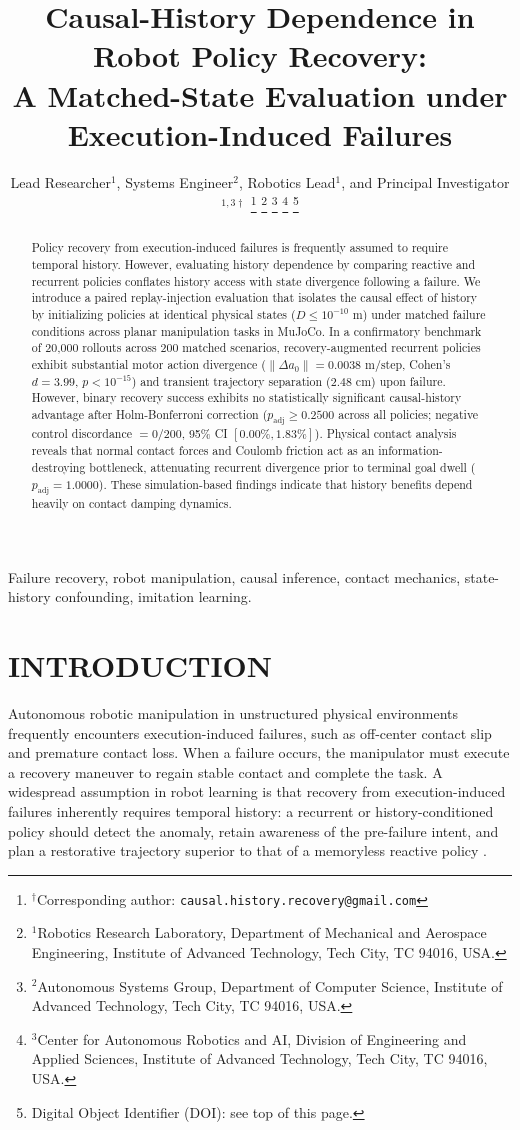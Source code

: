 \documentclass[letterpaper, 10 pt, conference]{ieeeconf}
\title{\LARGE \bf
Causal-History Dependence in Robot Policy Recovery: \\
A Matched-State Evaluation under Execution-Induced Failures
}
\author{Lead Researcher$^{1}$, Systems Engineer$^{2}$, Robotics Lead$^{1}$, and Principal Investigator$^{1,3\dagger}$%
\thanks{$^{\dagger}$Corresponding author: {\tt\small causal.history.recovery@gmail.com}}%
\thanks{$^{1}$Robotics Research Laboratory, Department of Mechanical and Aerospace Engineering, Institute of Advanced Technology, Tech City, TC 94016, USA.}%
\thanks{$^{2}$Autonomous Systems Group, Department of Computer Science, Institute of Advanced Technology, Tech City, TC 94016, USA.}%
\thanks{$^{3}$Center for Autonomous Robotics and AI, Division of Engineering and Applied Sciences, Institute of Advanced Technology, Tech City, TC 94016, USA.}%
\thanks{Digital Object Identifier (DOI): see top of this page.}%
}
\begin{document}
\maketitle
\thispagestyle{empty}
\pagestyle{empty}

\begin{abstract}
Policy recovery from execution-induced failures is frequently assumed to require temporal history. However, evaluating history dependence by comparing reactive and recurrent policies conflates history access with state divergence following a failure. We introduce a paired replay-injection evaluation that isolates the causal effect of history by initializing policies at identical physical states ($D \le 10^{-10}\text{ m}$) under matched failure conditions across planar manipulation tasks in MuJoCo. In a confirmatory benchmark of 20,000 rollouts across 200 matched scenarios, recovery-augmented recurrent policies exhibit substantial motor action divergence ($\|\Delta a_0\| = 0.0038\text{ m/step}$, Cohen's $d = 3.99$, $p < 10^{-15}$) and transient trajectory separation ($2.48\text{ cm}$) upon failure. However, binary recovery success exhibits no statistically significant causal-history advantage after Holm-Bonferroni correction ($p_\text{adj} \ge 0.2500$ across all policies; negative control discordance $= 0/200$, 95\% CI $[0.00\%, 1.83\%]$). Physical contact analysis reveals that normal contact forces and Coulomb friction act as an information-destroying bottleneck, attenuating recurrent divergence prior to terminal goal dwell ($p_\text{adj} = 1.0000$). These simulation-based findings indicate that history benefits depend heavily on contact damping dynamics.
\end{abstract}

\begin{keywords}
Failure recovery, robot manipulation, causal inference, contact mechanics, state-history confounding, imitation learning.
\end{keywords}

\section{INTRODUCTION}
\label{sec:introduction}

Autonomous robotic manipulation in unstructured physical environments frequently encounters execution-induced failures, such as off-center contact slip and premature contact loss. When a failure occurs, the manipulator must execute a recovery maneuver to regain stable contact and complete the task. A widespread assumption in robot learning is that recovery from execution-induced failures inherently requires temporal history: a recurrent or history-conditioned policy should detect the anomaly, retain awareness of the pre-failure intent, and plan a restorative trajectory superior to that of a memoryless reactive policy \cite{liu2024roborecover, kumar2021rma}.
\end{document}
